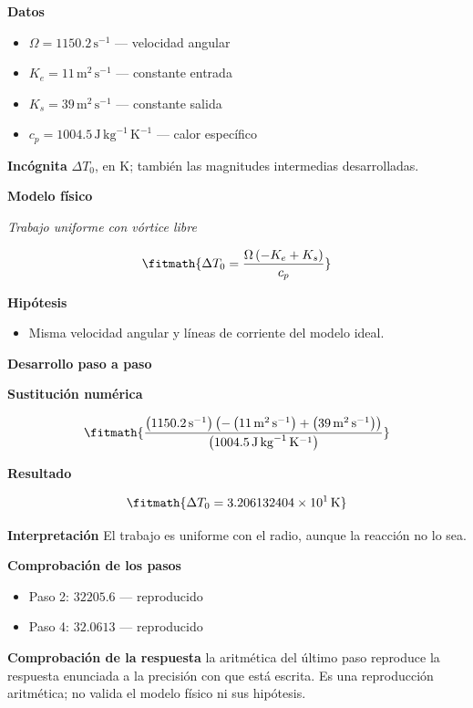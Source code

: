 \documentclass[10pt,openany]{book}
\begin{document}
\noindent\textbf{Datos}
\begin{itemize}
\item $\Omega = 1150.2\,\mathrm{s}^{-1}$ — velocidad angular
\item $K_e = 11\,\mathrm{m}^{2}\,\mathrm{s}^{-1}$ — constante entrada
\item $K_s = 39\,\mathrm{m}^{2}\,\mathrm{s}^{-1}$ — constante salida
\item $c_p = 1004.5\,\mathrm{J}\,\mathrm{kg}^{-1}\,\mathrm{K}^{-1}$ — calor específico
\end{itemize}

\noindent\textbf{Incógnita}
$\Delta T_0$, en $\mathrm{K}$; también las magnitudes intermedias desarrolladas.

\noindent\textbf{Modelo físico}

\noindent\textit{Trabajo uniforme con vórtice libre}

\[
\fitmath{\Delta T_0=\frac{\Omega \left(- K_e + K_s\right)}{c_p}}
\]

\noindent\textbf{Hipótesis}
\begin{itemize}
\item Misma velocidad angular y líneas de corriente del modelo ideal.
\end{itemize}

\noindent\textbf{Desarrollo paso a paso}



\noindent\textbf{Sustitución numérica}

\[
\fitmath{\frac{\left(1150.2\,\mathrm{s}^{-1}\right) \left(- \left(11\,\mathrm{m}^{2}\,\mathrm{s}^{-1}\right) + \left(39\,\mathrm{m}^{2}\,\mathrm{s}^{-1}\right)\right)}{\left(1004.5\,\mathrm{J}\,\mathrm{kg}^{-1}\,\mathrm{K}^{-1}\right)}}
\]

\noindent\textbf{Resultado}

\[
\fitmath{\Delta T_0=3.206132404\times10^{1}\,\mathrm{K}}
\]

\noindent\textbf{Interpretación}
El trabajo es uniforme con el radio, aunque la reacción no lo sea.

\noindent\textbf{Comprobación de los pasos}
\begin{itemize}
\item Paso 2: $32205.6$ — reproducido
\item Paso 4: $32.0613$ — reproducido
\end{itemize}

\noindent\textbf{Comprobación de la respuesta} la aritmética del último paso reproduce la respuesta enunciada a la precisión con que está escrita. Es una reproducción aritmética; no valida el modelo físico ni sus hipótesis.
\end{document}
